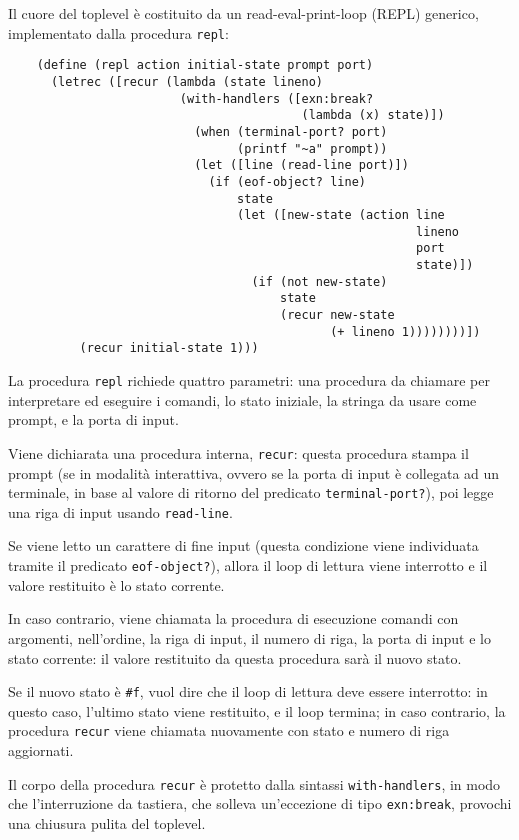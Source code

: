 Il cuore del toplevel \`e costituito da un read-eval-print-loop (REPL)
generico, implementato dalla procedura \lstinline{repl}:

\begin{lstlisting}
    (define (repl action initial-state prompt port)
      (letrec ([recur (lambda (state lineno)
                        (with-handlers ([exn:break?
                                         (lambda (x) state)])
                          (when (terminal-port? port)
                                (printf "~a" prompt))
                          (let ([line (read-line port)])
                            (if (eof-object? line)
                                state
                                (let ([new-state (action line
                                                         lineno
                                                         port
                                                         state)])
                                  (if (not new-state)
                                      state
                                      (recur new-state
                                             (+ lineno 1))))))))])
          (recur initial-state 1)))
\end{lstlisting}

La procedura \lstinline{repl} richiede quattro parametri: una procedura
da chiamare per interpretare ed eseguire i comandi, lo stato iniziale,
la stringa da usare come prompt, e la porta di input.

Viene dichiarata una procedura interna, \lstinline{recur}: questa
procedura stampa il prompt (se in modalit\`a interattiva, ovvero se la
porta di input \`e collegata ad un terminale, in base al valore di
ritorno del predicato \lstinline{terminal-port?}), poi legge una riga
di input usando \lstinline{read-line}.

Se viene letto un carattere di fine input (questa condizione viene
individuata tramite il predicato \lstinline{eof-object?}), allora il
loop di lettura viene interrotto e il valore restituito \`e lo stato
corrente.

In caso contrario, viene chiamata la procedura di esecuzione comandi
con argomenti, nell'ordine, la riga di input, il numero di riga, la
porta di input e lo stato corrente: il valore restituito da questa
procedura sar\`a il nuovo stato.

Se il nuovo stato \`e \lstinline{#f}, vuol dire che il loop di lettura
deve essere interrotto: in questo caso, l'ultimo stato viene restituito,
e il loop termina; in caso contrario, la procedura \lstinline{recur}
viene chiamata nuovamente con stato e numero di riga aggiornati.

Il corpo della procedura \lstinline{recur} \`e protetto dalla sintassi
\lstinline{with-handlers}, in modo che l'interruzione da tastiera,
che solleva un'eccezione di tipo \lstinline{exn:break}, provochi
una chiusura pulita del toplevel.
